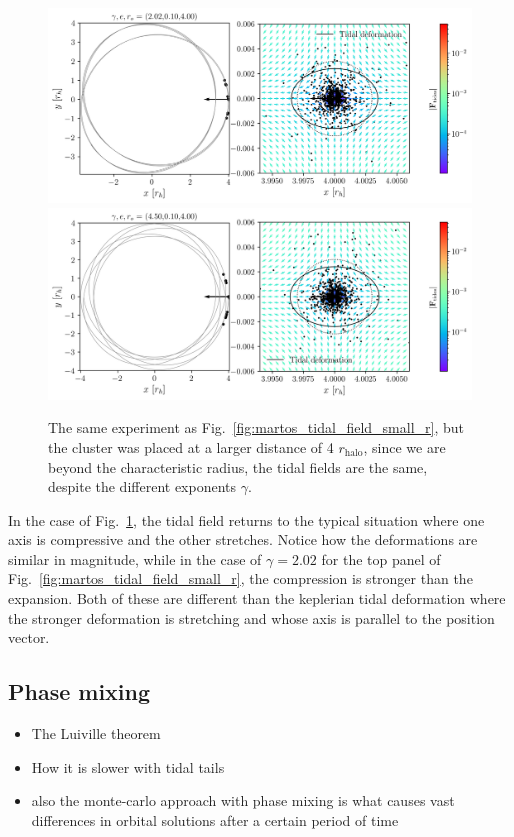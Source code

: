             \begin{figure}
                \includegraphics[width=\linewidth]{images/martos_tidal_field_202_10_400.png}
                \includegraphics[width=\linewidth]{images/martos_tidal_field_450_10_400.png}
                \caption{The same experiment as Fig.~\ref{fig:martos_tidal_field_small_r}, but the cluster was placed at a larger distance of 4 $r_\textrm{halo}$, since we are beyond the characteristic radius, the tidal fields are the same, despite the different exponents $\gamma$.}
                \label{fig:martos_tidal_field_big_r}
            \end{figure}

            In the case of Fig.~\ref{fig:martos_tidal_field_big_r}, the tidal field returns to the typical situation where one axis is compressive and the other stretches. Notice how the deformations are similar in magnitude, while in the case of $\gamma=2.02$ for the top panel of Fig.~\ref{fig:martos_tidal_field_small_r}, the compression is stronger than the expansion. Both of these are different than the keplerian tidal deformation where the stronger deformation is stretching and whose axis is parallel to the position vector. 






    \subsection{Phase mixing}
        \begin{itemize}
            \item The Luiville theorem
            \item How it is slower with tidal tails 
            \item also the monte-carlo approach with phase mixing is what causes vast differences in orbital solutions after a certain period of time 
        \end{itemize}
    
